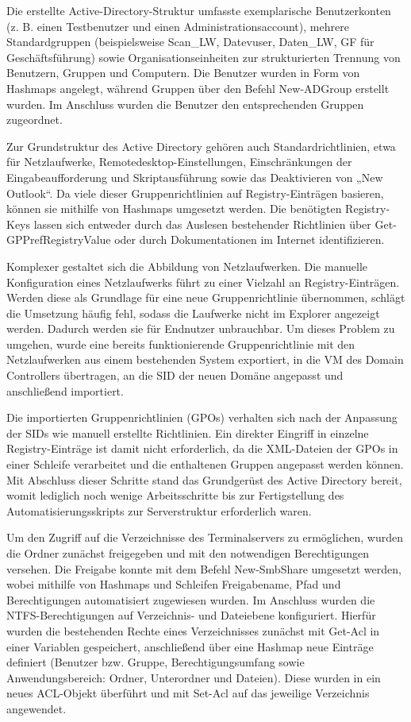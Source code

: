 \documentclass[conference]{IEEEtran}
\begin{document}
Die erstellte Active-Directory-Struktur umfasste exemplarische Benutzerkonten (z. B. einen Testbenutzer und einen Administrationsaccount), mehrere Standardgruppen (beispielsweise Scan_LW, Datevuser, Daten_LW, GF für Geschäftsführung) sowie Organisationseinheiten zur strukturierten Trennung von Benutzern, Gruppen und Computern. Die Benutzer wurden in Form von Hashmaps angelegt, während Gruppen über den Befehl New-ADGroup erstellt wurden. Im Anschluss wurden die Benutzer den entsprechenden Gruppen zugeordnet.

Zur Grundstruktur des Active Directory gehören auch Standardrichtlinien, etwa für Netzlaufwerke, Remotedesktop-Einstellungen, Einschränkungen der Eingabeaufforderung und Skriptausführung sowie das Deaktivieren von „New Outlook“. Da viele dieser Gruppenrichtlinien auf Registry-Einträgen basieren, können sie mithilfe von Hashmaps umgesetzt werden. Die benötigten Registry-Keys lassen sich entweder durch das Auslesen bestehender Richtlinien über Get-GPPrefRegistryValue oder durch Dokumentationen im Internet identifizieren.

Komplexer gestaltet sich die Abbildung von Netzlaufwerken. Die manuelle Konfiguration eines Netzlaufwerks führt zu einer Vielzahl an Registry-Einträgen. Werden diese als Grundlage für eine neue Gruppenrichtlinie übernommen, schlägt die Umsetzung häufig fehl, sodass die Laufwerke nicht im Explorer angezeigt werden. Dadurch werden sie für Endnutzer unbrauchbar. Um dieses Problem zu umgehen, wurde eine bereits funktionierende Gruppenrichtlinie mit den Netzlaufwerken aus einem bestehenden System exportiert, in die VM des Domain Controllers übertragen, an die SID der neuen Domäne angepasst und anschließend importiert.

Die importierten Gruppenrichtlinien (GPOs) verhalten sich nach der Anpassung der SIDs wie manuell erstellte Richtlinien. Ein direkter Eingriff in einzelne Registry-Einträge ist damit nicht erforderlich, da die XML-Dateien der GPOs in einer Schleife verarbeitet und die enthaltenen Gruppen angepasst werden können. Mit Abschluss dieser Schritte stand das Grundgerüst des Active Directory bereit, womit lediglich noch wenige Arbeitsschritte bis zur Fertigstellung des Automatisierungsskripts zur Serverstruktur erforderlich waren.

Um den Zugriff auf die Verzeichnisse des Terminalservers zu ermöglichen, wurden die Ordner zunächst freigegeben und mit den notwendigen Berechtigungen versehen. Die Freigabe konnte mit dem Befehl New-SmbShare umgesetzt werden, wobei mithilfe von Hashmaps und Schleifen Freigabename, Pfad und Berechtigungen automatisiert zugewiesen wurden. Im Anschluss wurden die NTFS-Berechtigungen auf Verzeichnis- und Dateiebene konfiguriert. Hierfür wurden die bestehenden Rechte eines Verzeichnisses zunächst mit Get-Acl in einer Variablen gespeichert, anschließend über eine Hashmap neue Einträge definiert (Benutzer bzw. Gruppe, Berechtigungsumfang sowie Anwendungsbereich: Ordner, Unterordner und Dateien). Diese wurden in ein neues ACL-Objekt überführt und mit Set-Acl auf das jeweilige Verzeichnis angewendet.
\end{document}
